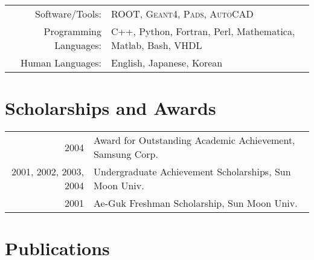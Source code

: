 \documentclass[a4paper,10pt]{article} %
\begin{document}
\begin{tabular}{rl}
	Software/Tools: & \textsc{ROOT}, \textsc{Geant4}, \textsc{Pads},
	\textsc{AutoCAD}\\
	Programming Languages: & C++, Python, Fortran, Perl, Mathematica, Matlab, Bash, VHDL\\
	Human Languages: & English, Japanese, Korean
\end{tabular}


\section{Scholarships and Awards}

\begin{tabular}{rl}
	2004 & Award for Outstanding Academic Achievement, Samsung Corp.\\
	2001, 2002, 2003, 2004 & Undergraduate Achievement Scholarships, Sun Moon
	Univ.\\
	2001 & Ae-Guk Freshman Scholarship, Sun Moon Univ.\\
\end{tabular}


%
%


\section{Publications}
\end{document}
